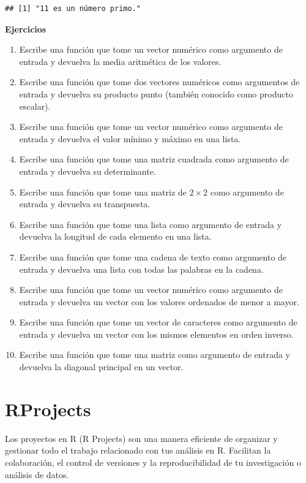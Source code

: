 \documentclass[
]{book}
\begin{document}
\begin{verbatim}
## [1] "11 es un número primo."
\end{verbatim}

\textbf{Ejercicios}

\begin{enumerate}
\def\labelenumi{\arabic{enumi}.}
\item
  Escribe una función que tome un vector numérico como argumento de entrada y devuelva la media aritmética de los valores.
\item
  Escribe una función que tome dos vectores numéricos como argumentos de entrada y devuelva su producto punto (también conocido como producto escalar).
\item
  Escribe una función que tome un vector numérico como argumento de entrada y devuelva el valor mínimo y máximo en una lista.
\item
  Escribe una función que tome una matriz cuadrada como argumento de entrada y devuelva su determinante.
\item
  Escribe una función que tome una matriz de \(2 \times 2\) como argumento de entrada y devuelva su transpuesta.
\item
  Escribe una función que tome una lista como argumento de entrada y devuelva la longitud de cada elemento en una lista.
\item
  Escribe una función que tome una cadena de texto como argumento de entrada y devuelva una lista con todas las palabras en la cadena.
\item
  Escribe una función que tome un vector numérico como argumento de entrada y devuelva un vector con los valores ordenados de menor a mayor.
\item
  Escribe una función que tome un vector de caracteres como argumento de entrada y devuelva un vector con los mismos elementos en orden inverso.
\item
  Escribe una función que tome una matriz como argumento de entrada y devuelva la diagonal principal en un vector.
\end{enumerate}

\hypertarget{rprojects}{%
\chapter{RProjects}\label{rprojects}}

Los proyectos en R (R Projects) son una manera eficiente de organizar y gestionar todo el trabajo relacionado con tus análisis en R. Facilitan la colaboración, el control de versiones y la reproducibilidad de tu investigación o análisis de datos.
\end{document}
